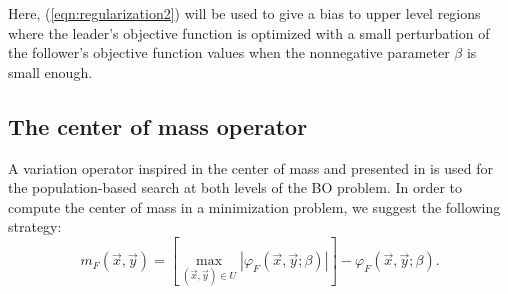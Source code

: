 \documentclass[conference]{IEEEtran}
\theoremstyle{definition}
\begin{document}
Here, (\ref{eqn:regularization2}) will be used to give a bias to upper level
regions where the leader's objective function is optimized with a small perturbation
of the follower's objective function values when the nonnegative parameter $\beta$
is small enough. 



\subsection{The center of mass operator} %
\label{sub:the_center_operator}
% 

A variation operator inspired in the center of mass and presented in \cite{Mejia2018}
is used for the population-based search at both levels of the BO problem. In order
to compute the center of mass in a minimization problem, we suggest the following
strategy:
% 
\[
    m_F(\vec{x}, \vec{y}) = \left[ \max_{(\vec{x}, \vec{y})\in U} |\varphi_F (\vec{x}, \vec{y}; \beta)| \right]
                            - \varphi_F (\vec{x}, \vec{y}; \beta).
\]
\end{document}
